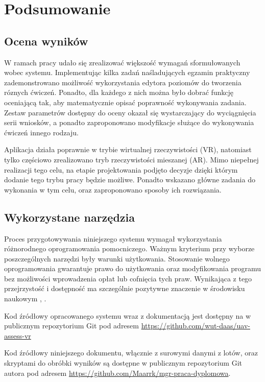 \newpage
\section{Podsumowanie}

\subsection{Ocena wyników}
W ramach pracy udało się zrealizować większość wymagań sformułowanych wobec systemu. Implementując kilka zadań naśladujących egzamin praktyczny zademonstrowano możliwość wykorzystania edytora poziomów do tworzenia róznych ćwiczeń. Ponadto, dla każdego z nich można było dobrać funkcję oceniającą tak, aby matematycznie opisać poprawność wykonywania zadania. Zestaw parametrów dostępny do oceny okazał się wystarczający do wyciągnięcia serii wniosków, a ponadto zaproponowano modyfikacje służące do wykonywania ćwiczeń innego rodzaju.

Aplikacja działa poprawnie w trybie wirtualnej rzeczywistości (VR), natomiast tylko częściowo zrealizowano tryb rzeczywistości mieszanej (AR). Mimo niepełnej realizacji tego celu, na etapie projektowania podjęto decyzje dzięki którym dodanie tego trybu pracy będzie możliwe. Ponadto wskazano główne zadania do wykonania w tym celu, oraz zaproponowano sposoby ich rozwiązania.

\subsection{Wykorzystane narzędzia}
Proces przygotowywania niniejszego systemu wymagał wykorzystania różnorodnego oprogramowania pomocniczego. Ważnym kryterium przy wyborze poszczególnych narzędzi były warunki użytkowania. Stosowanie wolnego oprogramowania gwarantuje prawo do użytkowania oraz modyfikowania programu bez możliwości wprowadzenia opłat lub cofnięcia tych praw. Wynikająca z tego przejrzystość i dostępność ma szczególnie pozytywne znaczenie w środowisku naukowym \cite{courant2006}, \cite{lakhan2008}.

Kod źródłowy opracowanego systemu wraz z dokumentacją jest dostępny na w publicznym repozytorium Git pod adresem \url{https://github.com/wut-daas/uav-assess-vr}

Kod źródłowy niniejszego dokumentu, włącznie z surowymi danymi z lotów, oraz skryptami do obróbki wyników są dostępne w publicznym repozytorium Git autora pod adresem \url{https://github.com/Maarrk/mgr-praca-dyplomowa}.

